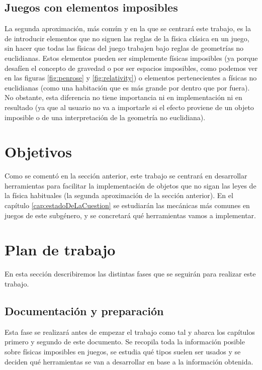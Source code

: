 \subsection{Juegos con elementos imposibles}
La segunda aproximación, más común y en la que se centrará este trabajo, es la de introducir elementos que no siguen las reglas de la física clásica en un juego, sin hacer que todas las físicas del juego trabajen bajo reglas de geometrías no euclidianas. Estos elementos pueden ser simplemente físicas imposibles (ya porque desafíen el concepto de gravedad o por ser espacios imposibles, como podemos ver en las figuras \ref{fig:penrose} y \ref{fig:relativity}) o elementos pertenecientes a físicas no euclidianas (como una habitación que es más grande por dentro que por fuera). No obstante, esta diferencia no tiene importancia ni en implementación ni en resultado (ya que al usuario no va a importarle si el efecto proviene de un objeto imposible o de una interpretación de la geometría no euclidiana).




\section{Objetivos}
\label{sec:Introduccion/Objetivos}
Como se comentó en la sección anterior, este trabajo se centrará en desarrollar herramientas para facilitar la implementación de objetos que no sigan las leyes de la física habituales (la segunda aproximación de la sección anterior).
En el capítulo \ref{cap:estadoDeLaCuestion} se estudiarán las mecánicas más comunes en juegos de este subgénero, y se concretará qué herramientas vamos a implementar.


\section{Plan de trabajo}
En esta sección describiremos las distintas fases que se seguirán para realizar este trabajo.


\subsection{Documentación y preparación}
Esta fase se realizará antes de empezar el trabajo como tal y abarca los capítulos primero y segundo de este documento. Se recopila toda la información posible sobre físicas imposibles en juegos, se estudia qué tipos suelen ser usados y se deciden qué herramientas se van a desarrollar en base a la información obtenida.

